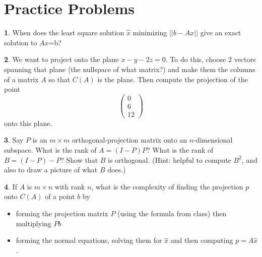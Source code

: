 \documentclass{article}
\theoremstyle{definition}
\newtheorem{prob}{}
\begin{document}
\section*{Practice Problems}
\begin{prob}
	When does the least square solution $\hat{x}$ minimizing $|| b-Ax||$ give an exact solution to $Ax$=b?
\end{prob}

\begin{prob}
	We want to project onto the plane $x-y-2z=0$. To do this, choose 2 vectors spanning that plane (the nullspace of what matrix?) and make them the columns of a matrix $A$ so that $C(A)$ is the plane. Then compute the projection of the point 
	\[\begin{pmatrix}
		0\\6\\12
	\end{pmatrix}\]
onto this plane.
\end{prob}

\begin{prob}
	Say $P$ is an $m \times m$ orthogonal-projection matrix onto an $n$-dimensional subspace. What is the rank of $A=(I-P)P$? What is the rank of $B=(I-P)-P$? Show that $B$ is orthogonal. (Hint: helpful to compute $B^2$, and also to draw a picture of what $B$ does.)
\end{prob}

\begin{prob}
	If $A$ is $m \times n$ with rank $n$, what is the complexity of finding the projection $p$ onto $C(A)$ of a point $b$ by 
	\begin{itemize}
		\item[(1)] forming the projection matrix $P$ (using the formula from class) then multiplying $Pb$
		\item[(2)] forming the normal equations, solving them for $\hat{x}$ and then computing $p=A \hat{x}$.
	\end{itemize}
\end{prob}
\end{document}

